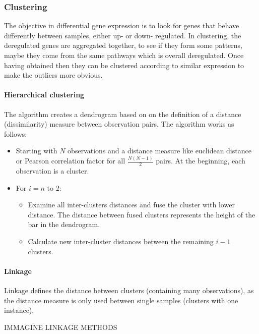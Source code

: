		\subsubsection{Clustering}
		The objective in differential gene expression is to look for genes that behave differently between samples, either up- or down- regulated.
		In clustering, the deregulated genes are aggregated together, to see if they form some patterns, maybe they come from the same pathways which is overall deregulated.
		Once having obtained then they can be clustered according to similar expression to make the outliers more obvious.

			\paragraph{Hierarchical clustering}
			The algorithm creates a dendrogram based on on the definition of a distance (dissimilarity) measure between observation pairs.
			The algorithm works as follows:

				\begin{itemize}
					\item Starting with $N$ observations and a distance measure like euclidean distance or Pearson correlation factor for all $\frac{N(N-1)}{2}$ pairs.
						At the beginning, each observation is a cluster.
					\item For $i =n$ to $2$:

						\begin{itemize}
							\item Examine all inter-clusters distances and fuse the cluster with lower distance.
								The distance between fused clusters represents the height of the bar in the dendrogram.
							\item Calculate new inter-cluster distances between the remaining $i-1$ clusters.
						\end{itemize}

				\end{itemize}

			\paragraph{Linkage}
			Linkage defines the distance between clusters (containing many observations), as the distance measure is only used between single samples (clusters with one instance).

			\begin{center}
				IMMAGINE LINKAGE METHODS
			\end{center}

